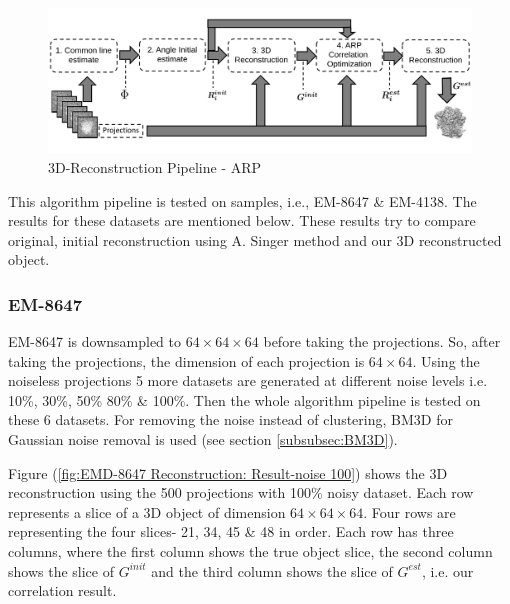 \documentclass[twoside]{iitbreport}
\begin{document}
\begin{figure}[H]
\includegraphics[width=1\textwidth]{3d-reconstrction-pipepline-ARP.png}
\centering
\captionsetup{justification=centering}
\caption{3D-Reconstruction Pipeline - ARP }
\label{fig:3D-Reconstruction Pipeline-ARP}
\end{figure}

This algorithm pipeline is tested on samples, i.e., EM-8647 \& EM-4138. The results for these datasets are mentioned below. These results try to compare original, initial reconstruction using A. Singer method and our 3D reconstructed object. 

\subsubsection{\textbf{EM-8647}}

EM-8647 is downsampled to $64\times64\times64$ before taking the projections. So, after taking the projections, the dimension of each projection is $64\times64$. Using the noiseless projections 5 more datasets are generated at different noise levels i.e. 10\%, 30\%, 50\% 80\% \& 100\%. Then the whole algorithm pipeline is tested on these 6 datasets. For removing the noise instead of clustering, BM3D for Gaussian noise removal is used (see section \ref{subsubsec:BM3D}).

Figure (\ref{fig:EMD-8647 Reconstruction: Result-noise 100}) shows the 3D reconstruction using the 500 projections with 100\% noisy dataset. Each row represents a slice of a 3D object of dimension $64\times64\times64$. Four rows are representing the four slices- 21, 34, 45 \& 48 in order. Each row has three columns, where the first column shows the true object slice, the second column shows the slice of $G^{init}$ and the third column shows the slice of $G^{est}$, i.e. our correlation result. 
\end{document}
